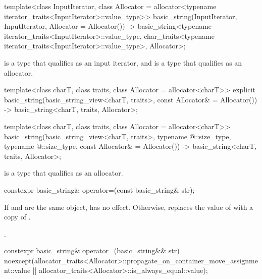 \begin{itemdecl}
template<class InputIterator,
         class Allocator = allocator<typename iterator_traits<InputIterator>::value_type>>
  basic_string(InputIterator, InputIterator, Allocator = Allocator())
    -> basic_string<typename iterator_traits<InputIterator>::value_type,
                    char_traits<typename iterator_traits<InputIterator>::value_type>,
                    Allocator>;
\end{itemdecl}

\begin{itemdescr}
\pnum
\constraints
{} is a type that qualifies as an input iterator,
and  is a type that qualifies as an allocator.
\end{itemdescr}

\begin{itemdecl}
template<class charT,
         class traits,
         class Allocator = allocator<charT>>
  explicit basic_string(basic_string_view<charT, traits>, const Allocator& = Allocator())
    -> basic_string<charT, traits, Allocator>;

template<class charT,
         class traits,
         class Allocator = allocator<charT>>
  basic_string(basic_string_view<charT, traits>,
               typename @\seebelow@::size_type, typename @\seebelow@::size_type,
               const Allocator& = Allocator())
    -> basic_string<charT, traits, Allocator>;
\end{itemdecl}

\begin{itemdescr}
\pnum
\constraints
{} is a type that qualifies as
an allocator.
\end{itemdescr}

%
\begin{itemdecl}
constexpr basic_string& operator=(const basic_string& str);
\end{itemdecl}

\begin{itemdescr}
\pnum
\effects
If  and  are the same object, has no effect.
Otherwise, replaces the value of  with a copy of .

\pnum
\returns
{}.
\end{itemdescr}

%
\begin{itemdecl}
constexpr basic_string& operator=(basic_string&& str)
  noexcept(allocator_traits<Allocator>::propagate_on_container_move_assignment::value ||
           allocator_traits<Allocator>::is_always_equal::value);
\end{itemdecl}

